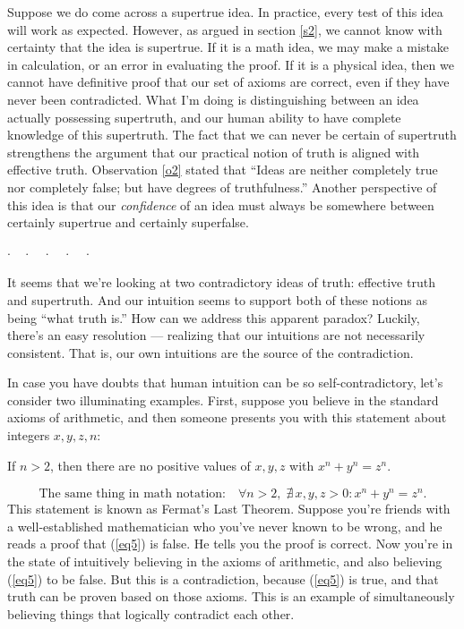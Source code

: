 \documentclass[11pt, oneside]{article}
\newcommand{\dotq}{\cdot\quad}
\newcommand{\scenebreak}{
    \medskip\centerline{$\dotq\dotq\dotq\dotq\cdot$}\medskip
}
\begin{document}
Suppose we do come across a supertrue idea. In practice, every test of this idea
will work as expected.
However, as argued in section \ref{s2}, we cannot know with certainty that
the idea is supertrue. If it is a math idea, we may make a mistake in
calculation, or an error in evaluating the proof. If it is a physical idea, then
we cannot have definitive proof that our set of axioms are correct, even if they
have never been contradicted. What I'm doing is distinguishing between an idea
actually possessing supertruth, and our human ability to have complete knowledge
of this supertruth. The fact that we can never be certain of supertruth
strengthens the argument that our practical notion of truth is aligned with
effective truth. Observation \ref{o2} stated that ``Ideas
are neither completely true nor completely false; but have degrees
of truthfulness.''
Another perspective of this idea is that
our {\em confidence} of an idea must always be somewhere between certainly
supertrue and certainly superfalse.

\scenebreak

It seems that we're looking at two contradictory ideas of truth: effective
truth and supertruth. And our intuition seems to support both of these notions
as being ``what truth is.'' How can we address this apparent paradox?
Luckily, there's an easy resolution --- realizing that our intuitions are not
necessarily consistent. That is, our own intuitions are the source of the
contradiction.

In case you have doubts that human intuition can be so self-contradictory, let's
consider two illuminating examples. First, suppose you believe in the standard
axioms of arithmetic, and then someone presents you with this statement about
integers $x,y,z,n$:
\begin{center}
    If $n>2$, then there are no positive values of $x,y,z$ with
    $x^n+y^n=z^n$.
\end{center}
\begin{equation}\label{eq5}
    \text{The same thing in math notation:}\quad
    \forall n>2,\; \nexists\, x,y,z>0: x^n + y^n = z^n.
\end{equation}
This statement is known as Fermat's Last Theorem.
Suppose you're friends with a well-established mathematician who you've never
known to be wrong, and he reads a proof that (\ref{eq5}) is false. He tells you
the proof is correct.
Now you're in the state of intuitively believing in the axioms of arithmetic,
and also believing (\ref{eq5}) to be false.
But this is a contradiction, because
(\ref{eq5}) is true, and that truth can be proven based on those axioms. This is
an example of simultaneously believing things that logically contradict each
other.
\end{document}
